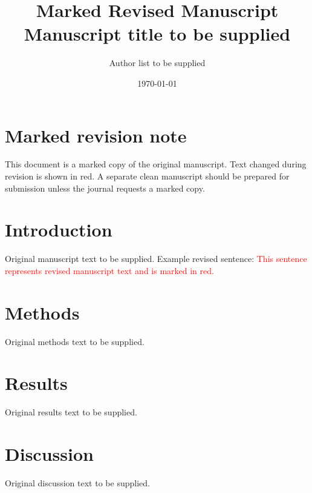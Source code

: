 \documentclass[journal]{IEEEtran}
\title{Marked Revised Manuscript\\
\large Manuscript title to be supplied}
\author{Author list to be supplied}
\date{\today}
\newcommand{\revised}[1]{\textcolor{red}{#1}}
\begin{document}
\maketitle

\section*{Marked revision note}

This document is a marked copy of the original manuscript. Text changed during
revision is shown in red. A separate clean manuscript should be prepared for
submission unless the journal requests a marked copy.

\section{Introduction}

Original manuscript text to be supplied. Example revised sentence:
\revised{This sentence represents revised manuscript text and is marked in red.}

\section{Methods}

Original methods text to be supplied.

\section{Results}

Original results text to be supplied.

\section{Discussion}

Original discussion text to be supplied.
\end{document}
